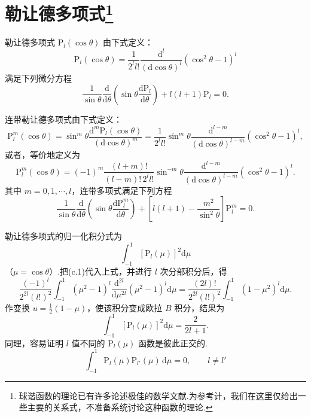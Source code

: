 \section[勒让德多项式]{勒让德多项式\protect\footnote{球谐函数的理论已有许多论述极佳的数学文献.为参考计，我们在这里仅给出一些主要的关系式，不准备系统讨论这种函数的理论.}}

勒让德多项式 $\mathrm{P}_l(\cos\theta)$ 由下式定义：
\begin{equation}
  \mathrm{P}_l(\cos\theta)=\frac{1}{2^ll!}
  \frac{\mathrm{d}^l}{(\mathrm{d}\cos\theta)^l}
  \left(\cos^2\theta-1\right)^l
\end{equation}
满足下列微分方程
\begin{equation}
  \frac{1}{\sin\theta}\frac{\mathrm{d}}{\mathrm{d}\theta}
  \left(\sin\theta\frac{\mathrm{dP}_l}{\mathrm{d}\theta}\right)
  +l(l+1)\mathrm{P}_l=0.
\end{equation}

连带勒让德多项式由下式定义：
\begin{equation}
  \mathrm{P}_l^m(\cos\theta)=\sin^m\theta
  \frac{\mathrm{d}^m\mathrm{P}_l(\cos\theta)}{(\mathrm{d}\cos\theta)^m}
  =\frac{1}{2^ll!}\sin^m\theta
  \frac{\mathrm{d}^{l-m}}{(\mathrm{d}\cos\theta)^{l-m}}
  \left(\cos^2\theta-1\right)^l,
\end{equation}
或者，等价地定义为
\begin{equation}
  \mathrm{P}_l^m(\cos\theta)=(-1)^m
  \frac{(l+m)!}{(l-m)!\,2^ll!}\sin^{-m}\theta
  \frac{\mathrm{d}^{l-m}}{(\mathrm{d}\cos\theta)^{l-m}}
  \left(\cos^2\theta-1\right)^l.
\end{equation}
其中 $m=0,1,\cdots,l$，连带多项式满足下列方程
\begin{equation}
  \frac{1}{\sin\theta}\frac{\mathrm{d}}{\mathrm{d}\theta}
  \left(\sin\theta\frac{\mathrm{dP}_l^m}{\mathrm{d}\theta}\right)
  +\left[l(l+1)-\frac{m^2}{\sin^2\theta}\right]\mathrm{P}_l^m=0.
\end{equation}

勒让德多项式的归一化积分式为
\begin{equation*}
  \int_{-1}^{1}\left[\mathrm{P}_l(\mu)\right]^2\mathrm{d}\mu
\end{equation*}
（$\mu=\cos\theta$）.把(c.1)代入上式，并进行 $l$ 次分部积分后，得
\begin{equation*}
  \frac{(-1)^l}{2^{2l}(l!)^2}\int_{-1}^{1}\left(\mu^2-1\right)^l
  \frac{\mathrm{d}^{2l}}{\mathrm{d}\mu^{2l}}\left(\mu^2-1\right)^l\mathrm{d}\mu
  =\frac{(2l)!}{2^{2l}(l!)^2}\int_{-1}^{1}\left(1-\mu^2\right)^l\mathrm{d}\mu.
\end{equation*}
作变换 $u=\frac{1}{2}(1-\mu)$，使该积分变成欧拉 $B$ 积分，结果为
\begin{equation}
  \int_{-1}^{1}\left[\mathrm{P}_l(\mu)\right]^2\mathrm{d}\mu
  =\frac{2}{2l+1}.
\end{equation}
同理，容易证明 $l$ 值不同的 $\mathrm{P}_l(\mu)$ 函数是彼此正交的.
\begin{equation}
  \int_{-1}^{1}\mathrm{P}_l(\mu)\mathrm{P}_{l'}(\mu)\,\mathrm{d}\mu=0,
  \qquad l\neq l'
\end{equation}

